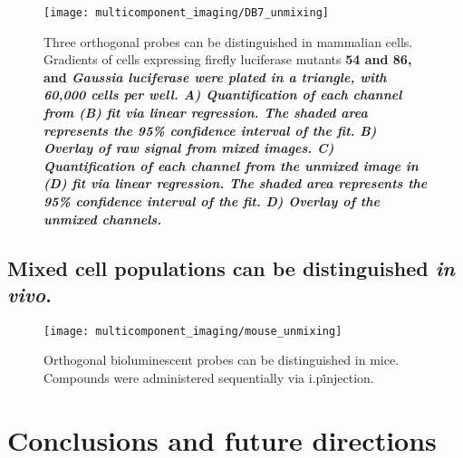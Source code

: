 \begin{figure}[htbp]
\texttt{[image: multicomponent\_imaging/DB7\_unmixing]}
\centering
\caption[Orthogonal bioluminescent probes can be distinguished in mammalian cells]{
Three orthogonal probes can be distinguished in mammalian cells. Gradients of cells expressing firefly luciferase mutants \bf{54} and \bf{86}, and \it{Gaussia} luciferase were plated in a triangle, with 60,000 cells per well. \bf{A)} Quantification of each channel from (B) fit via linear regression. The shaded area represents the 95\% confidence interval of the fit. \bf{B)} Overlay of raw signal from mixed images. \bf{C)} Quantification of each channel from the unmixed image in (D) fit via linear regression. The shaded area represents the 95\% confidence interval of the fit. \bf{D)} Overlay of the unmixed channels.
}
  \label{fig:DB7_unmixing}
\end{figure}

\subsection{Mixed cell populations can be distinguished \textit{in vivo}.}


\begin{figure}[htbp]
\texttt{[image: multicomponent\_imaging/mouse\_unmixing]}
\centering
\caption[Orthogonal bioluminescent probes can be distinguished in mice]{
Orthogonal bioluminescent probes can be distinguished in mice.
Compounds were administered sequentially via i.p\. injection.
}
  \label{fig:mouse_unmixing}
\end{figure}

\section{Conclusions and future directions}




